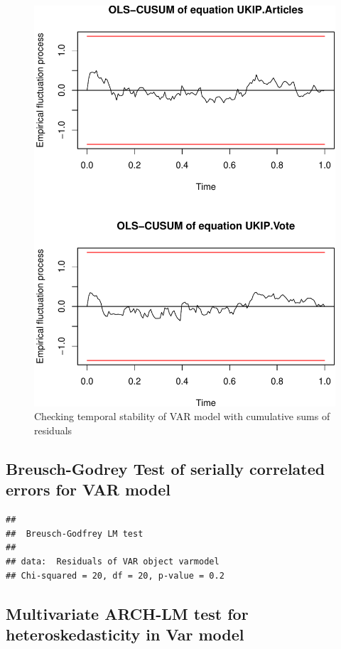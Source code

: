 \documentclass[12pt,]{article}
\makeatletter
\def\maxwidth{\ifdim\Gin@nat@width>\linewidth\linewidth
\else\Gin@nat@width\fi}
\let\Oldincludegraphics\includegraphics
\renewcommand{\includegraphics}[1]{\Oldincludegraphics[width=\maxwidth]{#1}}
\makeatother
\begin{document}
\begin{figure}[htbp]
\centering
\includegraphics{ukip_media_files/figure-latex/stability-check-vote-1.pdf}
\caption{Checking temporal stability of VAR model with cumulative sums
of residuals}
\end{figure}

\newpage

\subsection{Breusch-Godrey Test of serially correlated errors for VAR
model}\label{breusch-godrey-test-of-serially-correlated-errors-for-var-model}

\begin{verbatim}
## 
##  Breusch-Godfrey LM test
## 
## data:  Residuals of VAR object varmodel
## Chi-squared = 20, df = 20, p-value = 0.2
\end{verbatim}

\subsection{Multivariate ARCH-LM test for heteroskedasticity in Var
model}\label{multivariate-arch-lm-test-for-heteroskedasticity-in-var-model}
\end{document}
